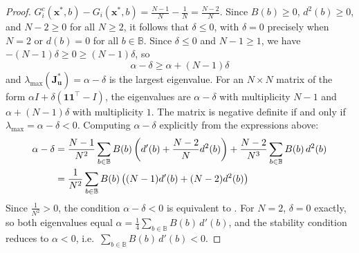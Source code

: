 \documentclass{article}
\begin{document}
\begin{proof}
                    $G_i^c(\mathbf{x}^*,b) - G_i(\mathbf{x}^*,b) = \frac{N-1}{N} - \frac{1}{N} = \frac{N-2}{N}$.
                    Since $B(b) \geq 0$, $d^2(b) \geq 0$, and $N - 2 \geq 0$ for all $N \geq 2$,
                    it follows that $\delta \leq 0$, with $\delta = 0$ precisely when $N = 2$
                    or $d(b) = 0$ for all $b \in \mathbb{B}$.
                    Since $\delta \leq 0$ and $N - 1 \geq 1$, we have
                    $-(N-1)\delta \geq 0 \geq (N-1)\delta$, so
                    \begin{equation}
                        \alpha - \delta \geq \alpha + (N-1)\delta
                    \end{equation}
                    and $\lambda_{\max}(\mathbf{J}_{\mathbf{u}}^*) = \alpha - \delta$ is the largest eigenvalue.
                    For an $N \times N$ matrix of the form $\alpha I + \delta(\mathbf{1}\mathbf{1}^\top - I)$,
                    the eigenvalues are $\alpha - \delta$ with multiplicity $N-1$ and
                    $\alpha + (N-1)\delta$ with multiplicity $1$.
                    The matrix is negative definite if and only if
                    $\lambda_{\max} = \alpha - \delta < 0$.
                    Computing $\alpha - \delta$ explicitly from the expressions above:
                    \begin{align}
                        \alpha - \delta
                        &= \frac{N-1}{N^2}\sum_{b\in\mathbb{B}} B(b)
                        \left(d'(b) + \frac{N-2}{N}d^2(b)\right)
                        + \frac{N-2}{N^3}\sum_{b\in\mathbb{B}} B(b)\,d^2(b) \notag\\
                        &= \frac{1}{N^2}\sum_{b\in\mathbb{B}}
                        B(b)\left((N-1)d'(b) + (N-2)d^2(b)\right)
                    \end{align}
                    Since $\frac{1}{N^2} > 0$, the condition $\alpha - \delta < 0$ is equivalent
                    to .
                    For $N = 2$, $\delta = 0$ exactly, so both eigenvalues equal
                    $\alpha = \frac{1}{4}\sum_{b\in\mathbb{B}} B(b)\,d'(b)$,
                    and the stability condition reduces to $\alpha < 0$,
                    i.e.\ $\sum_{b\in\mathbb{B}} B(b)\,d'(b) < 0$.
                \end{proof}
                
\end{document}
